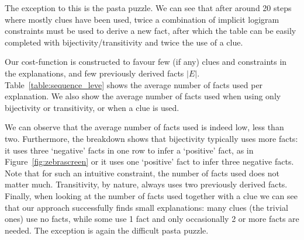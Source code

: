 The exception to this is the pasta puzzle. We can see that after around 20 steps where mostly clues have been used, twice a combination of implicit logigram constraints must be used to derive a new fact, after which the table can be easily completed with bijectivity/transitivity and twice the use of a clue.


Our cost-function is constructed to favour few (if any) clues and constraints in the explanations, and few previously derived facts $|E|$. Table~\ref{table:sequence_leve} shows the average number of facts used per explanation. We also show the average number of facts used when using only bijectivity or transitivity, or when a clue is used.

We can observe that the average number of facts used is indeed low, less than two. Furthermore, the breakdown shows that bijectivity typically uses more facts: it uses three `negative' facts in one row to infer a `positive' fact, as in Figure~\ref{fig:zebrascreen} or it uses one `positive' fact to infer three negative facts. Note that for such an intuitive constraint, the number of facts used does not matter much. Transitivity, by nature, always uses two previously derived facts. Finally, when looking at the number of facts used together with a clue we can see that our approach successfully finds small explanations: many clues (the trivial ones) use no facts, while some use 1 fact and only occasionally 2 or more facts are needed. The exception is again the difficult pasta puzzle.


